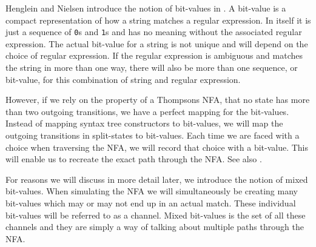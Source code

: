 Henglein and Nielsen introduce the notion of bit-values in
\cite{Henglein2010}. A bit-value is a compact representation of how a
string matches a regular expression. In itself it is just a sequence
of \texttt{0}s and \texttt{1}s and has no meaning without the
associated regular expression. The actual bit-value for a string is
not unique and will depend on the choice of regular expression. If the
regular expression is ambiguous and matches the string in more than
one way, there will also be more than one sequence, or bit-value, for
this combination of string and regular expression.

However, if we rely on the property of a Thompsons NFA, that no state
has more than two outgoing transitions, we have a perfect mapping for
the bit-values. Instead of mapping syntax tree constructors to
bit-values, we will map the outgoing transitions in split-states to
bit-values. Each time we are faced with a choice when traversing the
NFA, we will record that choice with a bit-value. This will enable us
to recreate the exact path through the NFA. See also \cite{Dube2000}.

For reasons we will discuss in more detail later, we introduce the notion of
mixed bit-values. When simulating the NFA we will
simultaneously be creating many bit-values which may or may not end up
in an actual match. These individual bit-values will be referred to as
a channel. Mixed bit-values is the set of all these channels and they
are simply a way of talking about multiple paths through the NFA.

